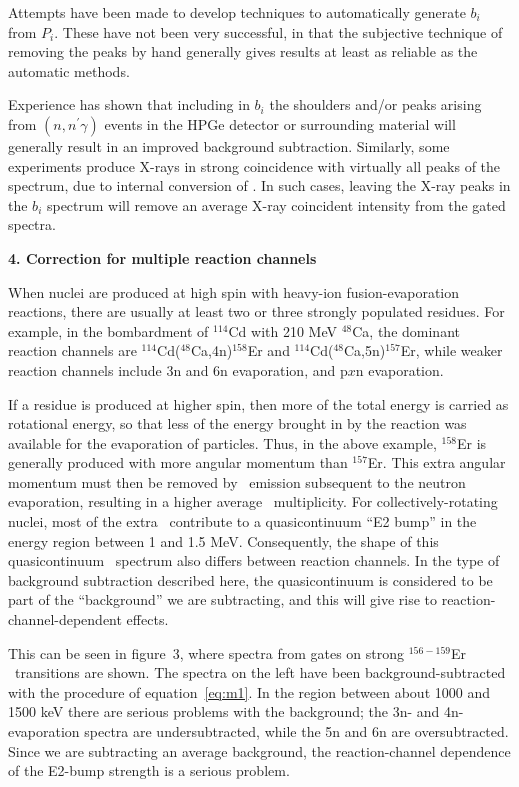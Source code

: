 Attempts have been made to develop techniques to automatically generate $b_i$
from $P_i$. These have not been very successful, in that the subjective
technique of removing the peaks by hand generally gives results at least as
reliable as the automatic methods.

Experience has shown that including in $b_i$ the shoulders and/or peaks
arising from $(n, n^{\prime}\gamma)$ events in the HPGe detector or surrounding
material will generally result in an improved background subtraction.
Similarly, some experiments produce X-rays in strong coincidence with
virtually all peaks of the spectrum, due to internal conversion of \grays.
In such cases, leaving the X-ray peaks in the $b_i$ spectrum will remove an
average X-ray coincident intensity from the gated spectra.


\begin{center}
{\bf             4. Correction for multiple reaction channels}
\end{center}

When nuclei are produced at high spin with heavy-ion fusion-evaporation
reactions, there are usually at least two or three strongly populated residues.
For example, in the bombardment of $^{114}$Cd with 210 MeV $^{48}$Ca, the
dominant reaction channels are $^{114}$Cd($^{48}$Ca,4n)$^{158}$Er and
$^{114}$Cd($^{48}$Ca,5n)$^{157}$Er, while weaker reaction channels include 3n
and 6n evaporation, and p$x$n evaporation.

If a residue is produced at higher spin, then more of the total energy is
carried as rotational energy, so that less of the energy brought in by the
reaction was available for the evaporation of particles. Thus, in the above
example, $^{158}$Er is generally produced with more angular momentum than
$^{157}$Er. This extra angular momentum must then be removed by \ghray\
emission subsequent to the neutron evaporation, resulting in a higher average
\ghray\ multiplicity. For collectively-rotating nuclei, most of the extra
\grays\ contribute to a quasicontinuum ``E2 bump'' in the energy region between
1 and 1.5 MeV. Consequently, the shape of this quasicontinuum \ghray\ spectrum
also differs between reaction channels. In the type of background subtraction
described here, the quasicontinuum is considered to be part of the
``background'' we are subtracting, and this will give rise to
reaction-channel-dependent effects.

This can be seen in figure~3, where spectra from gates on strong $^{156-159}$Er
\ghray\ transitions are shown. The spectra on the left have been
background-subtracted with the procedure of equation~\ref{eq:m1}. In the region
between about 1000 and 1500 keV there are serious problems with the background;
the 3n- and 4n-evaporation spectra are undersubtracted, while the 5n and 6n are
oversubtracted. Since we are subtracting an average background, the
reaction-channel dependence of the E2-bump strength is a serious problem.


